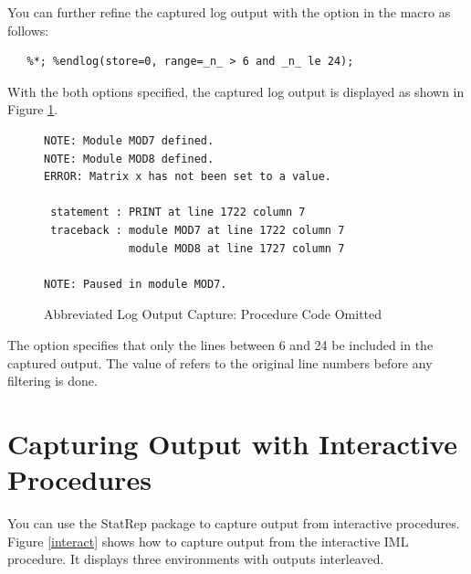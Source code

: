 \documentclass[article,oneside]{memoir}
\newcommand*{\StatRep}{\textsf{StatRep}\xspace}
\begin{document}
  You can further refine the captured log output with the
   option in the  macro as follows:

\begin{snugshade}
\begin{verbatim}
   %*; %endlog(store=0, range=_n_ > 6 and _n_ le 24);
\end{verbatim}
\end{snugshade}
  With the both options specified, the captured log output is displayed as
   shown in Figure \ref{logabbrev}.

\begin{figure}[H]
\begin{snugshade}
\begin{verbatim}
NOTE: Module MOD7 defined.
NOTE: Module MOD8 defined.
ERROR: Matrix x has not been set to a value.

 statement : PRINT at line 1722 column 7
 traceback : module MOD7 at line 1722 column 7
             module MOD8 at line 1727 column 7

NOTE: Paused in module MOD7.
\end{verbatim}
\end{snugshade}
\caption{Abbreviated Log Output Capture: Procedure Code Omitted}\label{logabbrev}
\end{figure}

  The  option specifies that only the lines between 6 and 24
  be included in the captured output.
  The value of  refers to the original line numbers before any filtering is done.


\section{Capturing Output with Interactive Procedures}
  You can use the \StatRep package to capture output from interactive procedures.
Figure \ref{interact} shows how to capture output from the interactive
  IML procedure.  It displays three  environments with 
  outputs interleaved.
\end{document}
